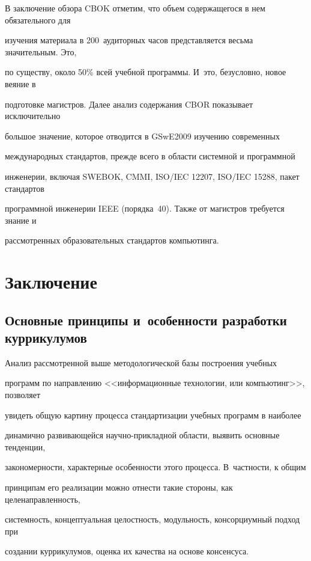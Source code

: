 В заключение обзора CBOK отметим, что объем содержащегося в нем обязательного для 

изучения материала в 200~аудиторных часов представляется весьма значительным. Это, 

по существу, около 50\% всей учебной программы. И~это, безусловно, новое веяние в 

подготовке магистров. Далее анализ содержания CBOR показывает исключительно 

большое значение, которое отводится в GSwE2009 изучению современных 

международных стандартов, прежде всего в области системной и программной 

инженерии, включая SWEBOK, CMMI, ISO/IEC 12207, ISO/IEC 15288, пакет стандартов 

программной инженерии IEEE (порядка~40). Также от магистров требуется знание и 

рассмотренных образовательных стандартов компьютинга. 



\section{Заключение}



\subsection{Основные принципы и~особенности разработки куррикулумов}



      Анализ рассмотренной выше методологической базы построения учебных 

программ по направлению <<информационные технологии, или компьютинг>>, позволяет 

увидеть общую картину процесса стандартизации учебных программ в наиболее 

динамично развивающейся научно-прикладной области, выявить основные тенденции, 

закономерности, характерные особенности этого процесса. В~частности, к общим 

принципам его реализации можно отнести такие стороны, как целенаправленность, 

системность, концептуальная целостность, модульность, консорциумный подход при 

создании куррикулумов, оценка их качества на основе консенсуса.

